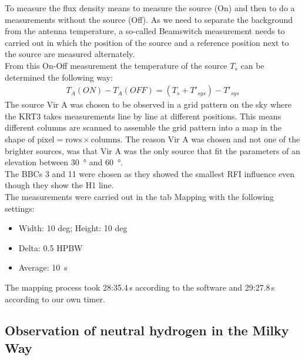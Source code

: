 \documentclass[10pt,a4paper, bibliography=totoc]{scrartcl}
\begin{document}
To measure the flux density means to measure the source (On) and then to do a measurements without the source (Off). As we need to separate the background from the antenna temperature, a so-called Beamswitch measurement needs to carried out in which the position of the source and a reference position next to the source are measured alternately.\\
From this On-Off measurement the temperature of the source $T_s$ can be determined the following way:
\begin{align}
	T_A(ON)-T_A(OFF)=(T_s+T'_{sys})-T'_{sys}
\label{eq:antenna onoff}
\end{align}
The source Vir A was chosen to be observed in a grid pattern on the sky where the KRT3 takes measurements line by line at different positions. This means different columns are scanned to assemble the grid pattern into a map in the shape of $\text{pixel} = \text{rows} \times \text{columns}$. The reason Vir A was chosen and not one of the brighter sources, was that Vir A was the only source that fit the parameters of an elevation between \qty{30}{\degree} and \qty{60}{\degree}.\\
The BBCs 3 and 11 were chosen as they showed the smallest RFI influence even though they show the H1 line.\\
The measurements were carried out in the tab Mapping with the following settings:
\begin{itemize}
	\item Width: 10 deg; Height: 10 deg
	\item Delta: 0.5 HPBW
	\item Average: \qty{10}{s}
\end{itemize}
The mapping process took 28:35.4\,s according to the software and 29:27.8\,s according to our own timer.

\subsection{Observation of neutral hydrogen in the Milky Way}
\end{document}

